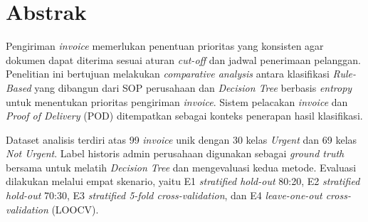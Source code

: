 \chapter*{Abstrak}


  



Pengiriman \textit{invoice} memerlukan penentuan prioritas yang konsisten agar dokumen dapat diterima sesuai aturan \textit{cut-off} dan jadwal penerimaan pelanggan. Penelitian ini bertujuan melakukan \textit{comparative analysis} antara klasifikasi \textit{Rule-Based} yang dibangun dari SOP perusahaan dan \textit{Decision Tree} berbasis \textit{entropy} untuk menentukan prioritas pengiriman \textit{invoice}. Sistem pelacakan \textit{invoice} dan \textit{Proof of Delivery} (POD) ditempatkan sebagai konteks penerapan hasil klasifikasi.

Dataset analisis terdiri atas 99 \textit{invoice} unik dengan 30 kelas \textit{Urgent} dan 69 kelas \textit{Not Urgent}. Label historis admin perusahaan digunakan sebagai \textit{ground truth} bersama untuk melatih \textit{Decision Tree} dan mengevaluasi kedua metode. Evaluasi dilakukan melalui empat skenario, yaitu E1 \textit{stratified hold-out} 80:20, E2 \textit{stratified hold-out} 70:30, E3 \textit{stratified 5-fold cross-validation}, dan E4 \textit{leave-one-out cross-validation} (LOOCV).

